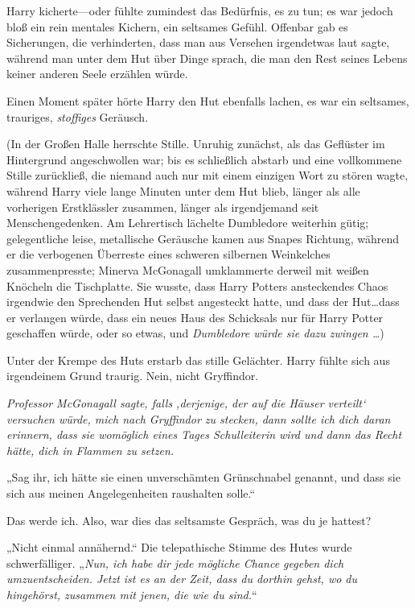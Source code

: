 {Harry kicherte—oder fühlte zumindest das Bedürfnis, es zu tun; es war jedoch bloß ein rein mentales Kichern, ein seltsames Gefühl. Offenbar gab es Sicherungen, die verhinderten, dass man aus Versehen irgendetwas laut sagte, während man unter dem Hut über Dinge sprach, die man den Rest seines Lebens keiner anderen Seele erzählen würde.

Einen Moment später hörte Harry den Hut ebenfalls lachen, es war ein seltsames, trauriges, \emph{stoffiges} Geräusch.

(In der Großen Halle herrschte Stille. Unruhig zunächst, als das Geflüster im Hintergrund angeschwollen war; bis es schließlich abstarb und eine vollkommene Stille zurückließ, die niemand auch nur mit einem einzigen Wort zu stören wagte, während Harry viele lange Minuten unter dem Hut blieb, länger als alle vorherigen Erstklässler zusammen, länger als irgendjemand seit Menschengedenken. Am Lehrertisch lächelte Dumbledore weiterhin gütig; gelegentliche leise, metallische Geräusche kamen aus Snapes Richtung, während er die verbogenen Überreste eines schweren silbernen Weinkelches zusammenpresste; Minerva McGonagall umklammerte derweil mit weißen Knöcheln die Tischplatte. Sie wusste, dass Harry Potters ansteckendes Chaos irgendwie den Sprechenden Hut selbst angesteckt hatte, und dass der Hut…dass er verlangen würde, dass ein neues Haus des Schicksals nur für Harry Potter geschaffen würde, oder so etwas, und \emph{Dumbledore würde sie dazu zwingen …})

Unter der Krempe des Huts erstarb das stille Gelächter. Harry fühlte sich aus irgendeinem Grund traurig. Nein, nicht Gryffindor.

\emph{Professor McGonagall sagte, falls ‚derjenige, der auf die Häuser verteilt` versuchen würde, mich nach Gryffindor zu stecken, dann sollte ich dich daran erinnern, dass sie womöglich eines Tages Schulleiterin wird und dann das Recht hätte, dich in Flammen zu setzen.}

„Sag ihr, ich hätte sie einen unverschämten Grünschnabel genannt, und dass sie sich aus meinen Angelegenheiten raushalten solle.“

Das werde ich. Also, war dies das seltsamste Gespräch, was du je hattest?

„Nicht einmal annähernd.“ Die telepathische Stimme des Hutes wurde schwerfälliger. „\emph{Nun, ich habe dir jede mögliche Chance gegeben dich umzuentscheiden. Jetzt ist es an der Zeit, dass du dorthin gehst, wo du hingehörst, zusammen mit jenen, die wie du sind.}“

}
